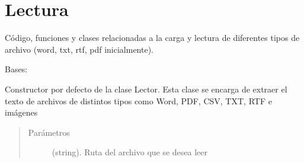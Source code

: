 \documentclass[letterpaper,10pt,openany,spanish]{sphinxmanual}
\begin{document}
\chapter{Lectura}
\label{\detokenize{funciones/lectura:module-lectura}}\label{\detokenize{funciones/lectura:lectura}}\label{\detokenize{funciones/lectura::doc}}
Código, funciones y clases relacionadas a la carga y lectura de
diferentes tipos de archivo (word, txt, rtf, pdf inicialmente).

\begin{fulllineitems}
\label{\detokenize{funciones/lectura:lectura.Lector}}
Bases: 

Constructor por defecto de la clase Lector. Esta clase se encarga de extraer             el texto de archivos de distintos tipos como Word, PDF, CSV, TXT, RTF e             imágenes
\begin{quote}\begin{description}
\item[{Parámetros}] \leavevmode
{} \textendash{} (string). Ruta del archivo que se desea leer

\end{description}\end{quote}


\end{fulllineitems}
\end{document}
